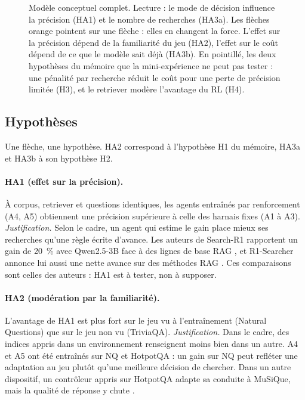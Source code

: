 \begin{figure}[ht]
\caption{Modèle conceptuel complet. Lecture : le mode de décision influence la précision (HA1) et le nombre de recherches (HA3a). Les flèches orange pointent sur une flèche : elles en changent la force. L'effet sur la précision dépend de la familiarité du jeu (HA2), l'effet sur le coût dépend de ce que le modèle sait déjà (HA3b). En pointillé, les deux hypothèses du mémoire que la mini-expérience ne peut pas tester : une pénalité par recherche réduit le coût pour une perte de précision limitée (H3), et le retriever modère l'avantage du RL (H4).}
\label{fig:modele}
\end{figure}

\subsection{Hypothèses}
Une flèche, une hypothèse. HA2 correspond à l'hypothèse H1 du mémoire, HA3a et HA3b à son hypothèse H2.

\paragraph{HA1 (effet sur la précision).} À corpus, retriever et questions identiques, les agents entraînés par renforcement (A4, A5) obtiennent une précision supérieure à celle des harnais fixes (A1 à A3).
\emph{Justification.} Selon le cadre, un agent qui estime le gain place mieux ses recherches qu'une règle écrite d'avance. Les auteurs de Search-R1 rapportent un gain de 20~\% avec Qwen2.5-3B face à des lignes de base RAG \citep{jin2025search}, et R1-Searcher annonce lui aussi une nette avance sur des méthodes RAG \citep{song2025r1}. Ces comparaisons sont celles des auteurs : HA1 est à tester, non à supposer.

\paragraph{HA2 (modération par la familiarité).} L'avantage de HA1 est plus fort sur le jeu vu à l'entraînement (Natural Questions) que sur le jeu non vu (TriviaQA).
\emph{Justification.} Dans le cadre, des indices appris dans un environnement renseignent moins bien dans un autre. A4 et A5 ont été entraînés sur NQ et HotpotQA : un gain sur NQ peut refléter une adaptation au jeu plutôt qu'une meilleure décision de chercher. Dans un autre dispositif, un contrôleur appris sur HotpotQA adapte sa conduite à MuSiQue, mais la qualité de réponse y chute \citep{raikote2026policy}.

